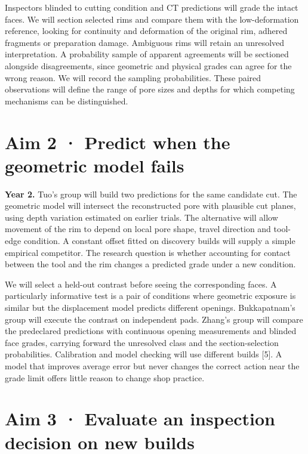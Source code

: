 \documentclass[11pt,letterpaper]{article}
\begin{document}
Inspectors blinded to cutting condition and CT predictions will grade the intact faces. We will section selected rims and compare them with the low-deformation reference, looking for continuity and deformation of the original rim, adhered fragments or preparation damage. Ambiguous rims will retain an unresolved interpretation. A probability sample of apparent agreements will be sectioned alongside disagreements, since geometric and physical grades can agree for the wrong reason. We will record the sampling probabilities. These paired observations will define the range of pore sizes and depths for which competing mechanisms can be distinguished.

\newpage

\section*{Aim 2 · Predict when the geometric model fails}

\textbf{Year 2.} Tuo’s group will build two predictions for the same candidate cut. The geometric model will intersect the reconstructed pore with plausible cut planes, using depth variation estimated on earlier trials. The alternative will allow movement of the rim to depend on local pore shape, travel direction and tool-edge condition. A constant offset fitted on discovery builds will supply a simple empirical competitor. The research question is whether accounting for contact between the tool and the rim changes a predicted grade under a new condition.

We will select a held-out contrast before seeing the corresponding faces. A particularly informative test is a pair of conditions where geometric exposure is similar but the displacement model predicts different openings. Bukkapatnam’s group will execute the contrast on independent pads. Zhang’s group will compare the predeclared predictions with continuous opening measurements and blinded face grades, carrying forward the unresolved class and the section-selection probabilities. Calibration and model checking will use different builds [5]. A model that improves average error but never changes the correct action near the grade limit offers little reason to change shop practice.

\section*{Aim 3 · Evaluate an inspection decision on new builds}
\end{document}
